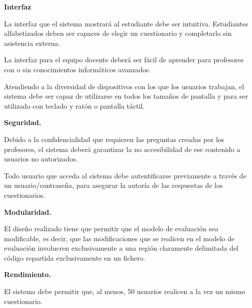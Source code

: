 \begin{rnf0}
	\item \textbf{Interfaz}
		\begin{rnf0*}
			\item La interfaz que el sistema mostrará al estudiante debe ser intuitiva. Estudiantes alfabetizados deben ser capaces de elegir un cuestionario y completarlo sin asistencia externa. %
			\item La interfaz para el equipo docente deberá ser fácil de aprender para profesores con o sin conocimientos informáticos avanzados. 
			\item Atendiendo a la diversidad de dispositivos con los que los usuarios trabajan, el sistema debe ser capaz de utilizarse en todos los tamaños de pantalla y para ser utilizado con teclado y ratón o pantalla táctil.
		\end{rnf0*}
	\item \textbf{Seguridad.}
		\begin{rnf0*}
			\item Debido a la confidencialidad que requieren las preguntas creadas por los profesores, el sistema deberá garantizar la no accesibilidad de ese contenido a usuarios no autorizados.
			\item Todo usuario que acceda al sistema debe autentificarse previamente a través de un usuario/contraseña, para asegurar la autoría de las respuestas de los cuestionarios.
		\end{rnf0*}
	\item \textbf{Modularidad.}
		\begin{rnf0*}
			\item El diseño realizado tiene que permitir que el modelo de evaluación sea modificable, es decir, que las modificaciones que se realicen en el modelo de evaluación involucren exclusivamente a una región claramente delimitada del código repartida exclusivamente en un fichero. \label{RNF:mofularidad}
		\end{rnf0*}
	\item \textbf{Rendimiento.}
		\begin{rnf0*}
			\item El sistema debe permitir que, al menos, 50 usuarios realicen a la vez un mismo cuestionario.
		\end{rnf0*}
\end{rnf0}


